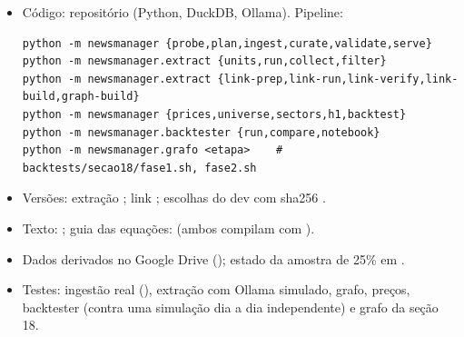 \documentclass[11pt,a4paper]{article}
\begin{document}
\begin{itemize}
  \item Código: repositório  (Python, DuckDB, Ollama). Pipeline:
\begin{verbatim}
python -m newsmanager {probe,plan,ingest,curate,validate,serve}
python -m newsmanager.extract {units,run,collect,filter}
python -m newsmanager.extract {link-prep,link-run,link-verify,link-build,graph-build}
python -m newsmanager {prices,universe,sectors,h1,backtest}
python -m newsmanager.backtester {run,compare,notebook}
python -m newsmanager.grafo <etapa>    # backtests/secao18/fase1.sh, fase2.sh
\end{verbatim}
  \item Versões: extração ; link ; escolhas do dev com sha256
        .
  \item Texto: ; guia das equações: 
        (ambos compilam com ).
  \item Dados derivados no Google Drive (); estado da amostra de 25\% em
        .
  \item Testes: ingestão real (), extração com Ollama simulado, grafo, preços,
        backtester (contra uma simulação dia a dia independente) e grafo da seção 18.
\end{itemize}

\sloppy


\end{document}
